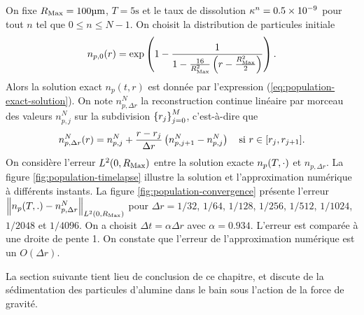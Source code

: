 On fixe $R_\mathrm{Max} = \num{100}\si{\micro\meter}$, $T = 5\si{\second}$ et
le taux de dissolution
$\kappa^n = \num{0.5e-9}$ pour tout $n$ tel que $0\leq n\leq
N-1$. On choisit la distribution de particules initiale
\begin{equation}\label{eq:population-test-ic}
  n_{p,0}(r) = \exp\left( 1 - \frac{1}{1 - \frac{16}{R_\mathrm{Max}^2}\left( r - \frac{R_\mathrm{Max}^2}{2} \right)} \right).
\end{equation}
Alors la solution exact $n_p(t, r)$ est donnée par l'expression
(\ref{eq:population-exact-solution}). On note $n_{p,\Delta r}^N$ la
reconstruction continue linéaire par morceau des valeurs $n_{p,j}^N$
sur la subdivision $\left\{ r_j \right\}_{j=0}^M$, c'est-à-dire que
\begin{equation}
  n_{p,\Delta r}^N(r) = n_{p,j}^N + \frac{r - r_j}{\Delta
    r}\left( n_{p,j+1}^N - n_{p,j}^N \right)\quad \text{si } r\in[r_j, r_{j+1}].
\end{equation}
On considère l'erreur $L^2(0,R_\mathrm{Max})$ entre la solution exacte
$n_p(T, \cdot)$ et $n_{p,\Delta r}$. La figure
\ref{fig:population-timelapse} illustre la solution et l'approximation
numérique à différents instants. La figure
\ref{fig:population-convergence} présente l'erreur $\left\lVert n_p(T, .) -
  n_{p,\Delta r}^N \right\rVert_{L^2(0,R_\mathrm{Max})}$ pour $\Delta r = 1/32$, $1/64$,
$1/128$, $1/256$, $1/512$, $1/1024$, $1/2048$ et $1/4096$. On a
choisit $\Delta t = \alpha\Delta r$ avec $\alpha =
\num{0.934}$. L'erreur est comparée à une droite de pente 1. On
constate que l'erreur de l'approximation numérique est un $O(\Delta
r)$.

La section suivante tient lieu de conclusion de ce chapitre, et discute
de la sédimentation des particules d'alumine dans le bain sous
l'action de la force de gravité.
